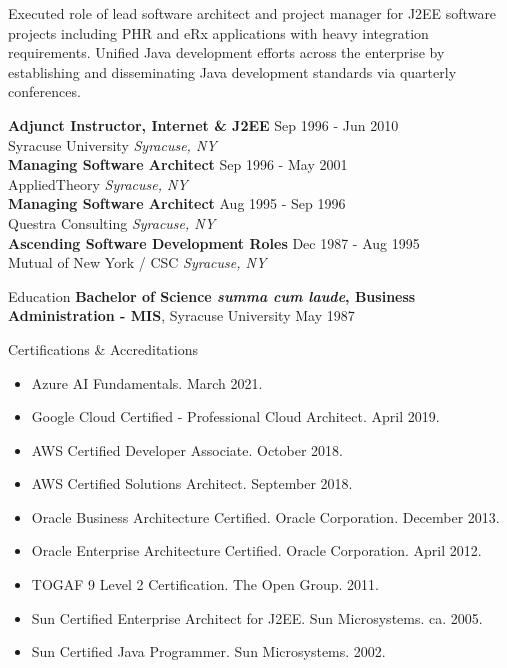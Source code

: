 \documentclass{resume} %
\begin{document}
Executed role of lead software architect and project manager for J2EE software projects including PHR and eRx applications with heavy integration requirements. Unified Java development efforts across the enterprise by establishing and disseminating Java development standards via quarterly conferences.

\textbf{Adjunct Instructor, Internet \& J2EE} \hfill Sep 1996 - Jun 2010\\
Syracuse University \hfill \textit{Syracuse, NY}\\
\textbf{Managing Software Architect} \hfill Sep 1996 - May 2001\\
AppliedTheory \hfill \textit{Syracuse, NY}\\
\textbf{Managing Software Architect} \hfill Aug 1995 - Sep 1996\\
Questra Consulting \hfill \textit{Syracuse, NY}\\
\textbf{Ascending Software Development Roles} \hfill Dec 1987 - Aug 1995\\
Mutual of New York / CSC \hfill \textit{Syracuse, NY}\\

\begin{rSection}{Education}
{\bf Bachelor of Science \emph{summa cum laude}, Business Administration - MIS}, Syracuse University \hfill {May 1987}\\
\end{rSection}

\begin{rSection}{Certifications \& Accreditations}
\begin{itemize}
\item Azure AI Fundamentals. March 2021.
\item Google Cloud Certified - Professional Cloud Architect. April 2019.
\item AWS Certified Developer Associate. October 2018.
\item AWS Certified Solutions Architect. September 2018.
\item Oracle Business Architecture Certified. Oracle Corporation. December 2013.
\item Oracle Enterprise Architecture Certified. Oracle Corporation. April 2012.
\item TOGAF 9 Level 2 Certification. The Open Group. 2011.
\item Sun Certified Enterprise Architect for J2EE. Sun Microsystems. ca. 2005.
\item Sun Certified Java Programmer. Sun Microsystems. 2002.
\end{itemize}
\end{rSection}
\end{document}
